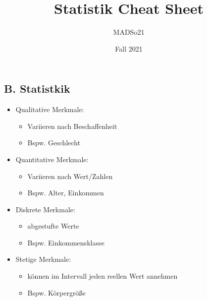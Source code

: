 \documentclass[a4paper]{article}
\title{Statistik Cheat Sheet}
\author{MADSo21}
\date{Fall 2021}
\begin{document}
\begin{landscape}
    \thispagestyle{empty}

    \begin{multicols}{4}
    \section{B. Statistkik}
        \begin{itemize}[noitemsep,nolistsep,leftmargin=*]
            \item Qualitative Merkmale: 
                \begin{itemize}[noitemsep,nolistsep,leftmargin=*]
                    \item Variieren nach Beschaffenheit
                    \item Bspw. Geschlecht
                \end{itemize}
            \item Quantitative Merkmale:
                \begin{itemize}[noitemsep,nolistsep]
                    \item Variieren nach Wert/Zahlen
                    \item Bspw. Alter, Einkommen
                \end{itemize}
        \end{itemize}
        \begin{itemize}[noitemsep,nolistsep,leftmargin=*]
            \item Diskrete Merkmale: 
                \begin{itemize}[noitemsep,nolistsep,leftmargin=*]
                    \item abgestufte Werte
                    \item Bspw. Einkommensklasse
                \end{itemize}
            \item Stetige Merkmale:
                \begin{itemize}[noitemsep,nolistsep,leftmargin=*]
                    \item können im Intervall jeden reellen Wert annehmen
                    \item Bspw. Körpergröße
                \end{itemize}
        \end{itemize}

\end{multicols}
\end{landscape}
\end{document}
